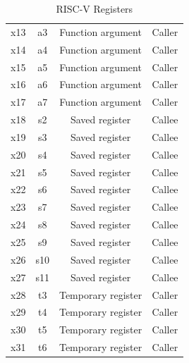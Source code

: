\begin{table}[h!]
\begin{tabular}{|c|c|c|c|}
        x13               & a3                & Function argument                & Caller         \\
        x14               & a4                & Function argument                & Caller         \\
        x15               & a5                & Function argument                & Caller         \\
        x16               & a6                & Function argument                & Caller         \\
        x17               & a7                & Function argument                & Caller         \\
        x18               & s2                & Saved register                   & Callee         \\
        x19               & s3                & Saved register                   & Callee         \\
        x20               & s4                & Saved register                   & Callee         \\
        x21               & s5                & Saved register                   & Callee         \\
        x22               & s6                & Saved register                   & Callee         \\
        x23               & s7                & Saved register                   & Callee         \\
        x24               & s8                & Saved register                   & Callee         \\
        x25               & s9                & Saved register                   & Callee         \\
        x26               & s10               & Saved register                   & Callee         \\
        x27               & s11               & Saved register                   & Callee         \\
        x28               & t3                & Temporary register               & Caller         \\
        x29               & t4                & Temporary register               & Caller         \\
        x30               & t5                & Temporary register               & Caller         \\
        x31               & t6                & Temporary register               & Caller         \\
        \hline
    \end{tabular}
    \caption{RISC-V Registers}
    \label{tab:registers}
\end{table}

